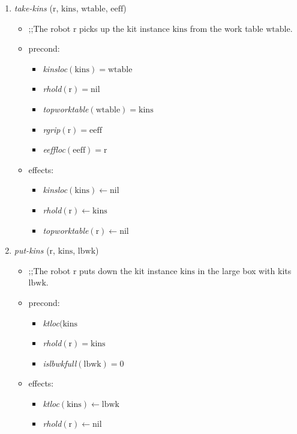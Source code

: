 \begin{small}
\begin{enumerate}
\item \textsl{take-kins} ($\mathrm{r}$, $\mathrm{kins}$, $\mathrm{wtable}$, $\mathrm{eeff}$)
\begin{itemize}
\item ;;The robot $\mathrm{r}$ picks up the kit instance $\mathrm{kins}$ from the work table $\mathrm{wtable}$.
\item precond:
\begin{itemize}
\item[]\emph{kinsloc}$\mathrm{(kins)=wtable}$
\item[]\emph{rhold}$\mathrm{(r)=nil}$
\item[]\emph{topworktable}$\mathrm{(wtable)=kins}$
\item[]\emph{rgrip}$\mathrm{(r)=eeff}$
\item[]\emph{eeffloc}$\mathrm{(eeff)=r}$
\end{itemize}
\item effects:
\begin{itemize}
\item[]\emph{kinsloc}$\mathrm{(kins)\leftarrow nil}$
\item[]\emph{rhold}$\mathrm{(r)\leftarrow kins}$
\item[]\emph{topworktable}$\mathrm{(r)\leftarrow nil}$
\end{itemize}
\end{itemize}

\item \textsl{put-kins} ($\mathrm{r}$, $\mathrm{kins}$, $\mathrm{lbwk}$)
\begin{itemize}
\item ;;The robot $\mathrm{r}$ puts down the kit instance $\mathrm{kins}$ in the large box with kits $\mathrm{lbwk}$.
\item precond:
\begin{itemize}
\item[]\emph{ktloc}$\mathrm{(kins}$
\item[]\emph{rhold}$\mathrm{(r)=kins}$
\item[]\emph{islbwkfull}$\mathrm{(lbwk)=0}$
\end{itemize}
\item effects:
\begin{itemize}
\item[]\emph{ktloc}$\mathrm{(kins)\leftarrow lbwk}$
\item[]\emph{rhold}$\mathrm{(r)\leftarrow nil}$
\end{itemize}
\end{itemize}


\end{enumerate}
\end{small}
